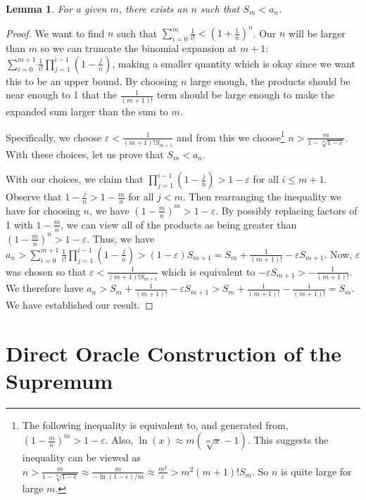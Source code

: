 \documentclass[12pt]{article}
\newtheorem{lemma}{Lemma}[subsection]
\begin{document}
\begin{lemma}\label{lem:snam}
For a given $m$, there exists an $n$ such that $S_m < a_n$.   
\end{lemma}

\begin{proof}
 We want to find $n$ such that $\sum_{i=0}^m \frac{1}{i!} < (1+\frac{1}{n})^n$. Our $n$ will be larger than $m$ so we can truncate the binomial expansion at $m+1$: $\sum_{i=0}^{m+1} \frac{1}{i!} \prod_{j=1}^{i-1} (1-\tfrac{j}{n})$, making a smaller quantity which is okay since we want this to be an upper bound. By choosing $n$ large enough, the products should be near enough to 1 that the $\frac{1}{(m+1)!}$ term should be large enough to make the expanded sum larger than the sum to $m$. 

 Specifically, we choose $\varepsilon < \frac{1}{(m+1)! S_{m+1}  }$ and from this we choose\footnote{The  following inequality is equivalent to, and generated from, $(1-\tfrac{m}{n})^m > 1 - \varepsilon$. Also, $\ln(x) \approx m (\sqrt[m]{x} -1)$. This suggests the inequality can be viewed as $n > \frac{m}{1 - \sqrt[m]{1-\epsilon}} \approx \frac{m}{-\ln(1 - \epsilon)/m} \approx \frac{m^2}{\varepsilon} > m^2 (m+1)! S_m$. So $n$ is quite large for large $m$.}  $n > \frac{m}{ 1 - \sqrt[m]{1-\varepsilon}}$. With these choices, let us prove that $S_m < a_n$. 
 
 With our choices, we claim that $\prod_{j=1}^{i-1} (1-\tfrac{j}{n}) > 1-\varepsilon$ for all $i \leq m+1$. Observe that $1-\tfrac{j}{n} > 1 -\tfrac{m}{n}$ for all $j < m$. Then rearranging the inequality we have for choosing $n$, we have $(1 - \tfrac{m}{n})^m > 1 - \varepsilon $. By possibly replacing factors of 1 with $1-\tfrac{m}{n}$, we can view all of the products as being greater than $(1 - \tfrac{m}{n})^n > 1-\varepsilon$.  Thus, we have 
 $a_n >  \sum_{i=0}^{m+1} \frac{1}{i!} \prod_{j=1}^{i-1} (1-\tfrac{j}{n}) > (1-\varepsilon) S_{m+1} = S_m + \frac{1}{(m+1)!} - \varepsilon S_{m+1}$.  Now, $\varepsilon$ was chosen so that $\varepsilon < \frac{1}{(m+1)! S_{m+1}}$ which is equivalent to $- \varepsilon S_{m+1} > -\frac{1}{(m+1)!}$. We therefore have $a_n > S_m + \frac{1}{(m+1)!} - \varepsilon S_{m+1} > S_m + \frac{1}{(m+1)!} - \frac{1}{(m+1)!} = S_m$. We have established our result. 
\end{proof}




\section{Direct Oracle Construction of the Supremum}\label{app:sup}
\end{document}
